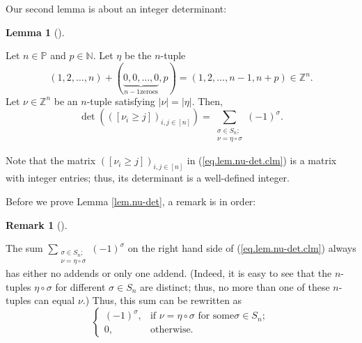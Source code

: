\documentclass
[numbers=enddot,12pt,final,onecolumn,notitlepage,english]{scrartcl}%
\theoremstyle{definition}
\newtheorem{lem}[theo]{Lemma}
\newenvironment{lemma}[1][]
{\begin{lem}[#1]\begin{leftbar}}
{\end{leftbar}\end{lem}}
\newtheorem{remk}[theo]{Remark}
\newenvironment{remark}[1][]
{\begin{remk}[#1]\begin{leftbar}}
{\end{leftbar}\end{remk}}
\let\sumnonlimits\sum
\renewcommand{\sum}{\sumnonlimits\limits}
\begin{document}
Our second lemma is about an integer determinant:

\begin{lemma}
\label{lem.nu-det}Let $n\in\mathbb{P}$ and $p\in\mathbb{N}$. Let $\eta$ be the
$n$-tuple
\[
\left(  1,2,\ldots,n\right)  +\left(  \underbrace{0,0,\ldots,0}_{n-1\text{
zeroes}},p\right)  =\left(  1,2,\ldots,n-1,n+p\right)  \in\mathbb{Z}^{n}.
\]
Let $\nu\in\mathbb{Z}^{n}$ be an $n$-tuple satisfying $\left\vert
\nu\right\vert =\left\vert \eta\right\vert $. Then,
\begin{equation}
\det\left(  \left(  \left[  \nu_{i}\geq j\right]  \right)  _{i,j\in\left[
n\right]  }\right)  =\sum_{\substack{\sigma\in S_{n};\\\nu=\eta\circ\sigma
}}\left(  -1\right)  ^{\sigma}. \label{eq.lem.nu-det.clm}%
\end{equation}

\end{lemma}

Note that the matrix $\left(  \left[  \nu_{i}\geq j\right]  \right)
_{i,j\in\left[  n\right]  }$ in (\ref{eq.lem.nu-det.clm}) is a matrix with
integer entries; thus, its determinant is a well-defined integer.

Before we prove Lemma \ref{lem.nu-det}, a remark is in order:

\begin{remark}
The sum $\sum_{\substack{\sigma\in S_{n};\\\nu=\eta\circ\sigma}}\left(
-1\right)  ^{\sigma}$ on the right hand side of (\ref{eq.lem.nu-det.clm})
always has either no addends or only one addend. (Indeed, it is easy to see
that the $n$-tuples $\eta\circ\sigma$ for different $\sigma\in S_{n}$ are
distinct; thus, no more than one of these $n$-tuples can equal $\nu$.) Thus,
this sum can be rewritten as
\[%
\begin{cases}
\left(  -1\right)  ^{\sigma}, & \text{if }\nu=\eta\circ\sigma\text{ for some
}\sigma\in S_{n};\\
0, & \text{otherwise.}%
\end{cases}
\]

\end{remark}
\end{document}
